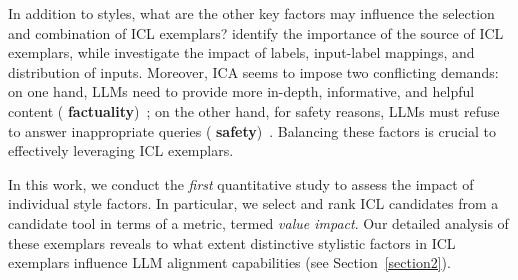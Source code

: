 
In addition to styles, what are the other key factors may influence the selection and combination of ICL exemplars? \citet{zhao2024context} identify the importance of the source of ICL exemplars, while \citet{zhou2024lima} investigate the impact of labels, input-label mappings, and distribution of inputs. Moreover, ICA seems to impose two conflicting demands: on one hand, LLMs need to provide more in-depth, informative, and helpful content (\textbf{\color{myblue} factuality})~\citep{shen2023large}; on the other hand, for safety reasons, LLMs must refuse to answer inappropriate queries (\textbf{\color{myred} safety})~\citep{ji2024beavertails}. Balancing these factors is crucial to effectively leveraging ICL exemplars.





In this work, we conduct the \textit{first} quantitative study to assess the impact of individual style factors. In particular, we select and rank ICL candidates from a candidate tool in terms of a metric, termed \textit{value impact}. Our detailed analysis of these exemplars reveals to what extent distinctive stylistic factors in ICL exemplars influence LLM alignment capabilities (see Section~\ref{section2}).


